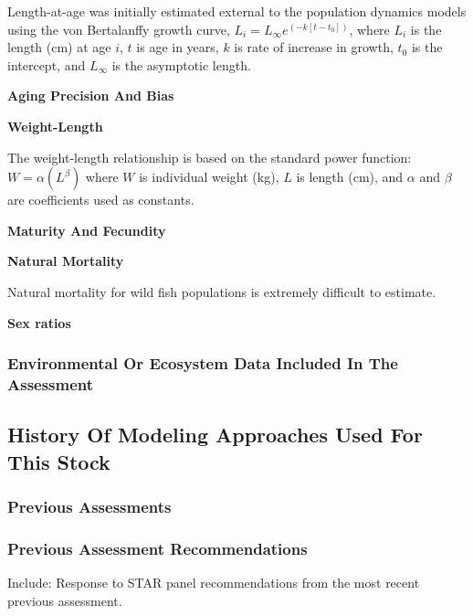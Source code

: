 \documentclass[12pt,]{article}
\begin{document}
Length-at-age was initially estimated external to the population
dynamics models using the von Bertalanffy growth curve,
\(L_i = L_{\infty}e^{(-k[t-t_0])}\), where \(L_i\) is the length (cm) at
age \(i\), \(t\) is age in years, \(k\) is rate of increase in growth,
\(t_0\) is the intercept, and \(L_{\infty}\) is the asymptotic length.

\vspace{.5cm} \textbf{Aging Precision And Bias}

\vspace{.5cm} \textbf{Weight-Length}

The weight-length relationship is based on the standard power function:
\(W = \alpha(L^\beta)\) where \(W\) is individual weight (kg), \(L\) is
length (cm), and \(\alpha\) and \(\beta\) are coefficients used as
constants.

\vspace{.5cm} \textbf{Maturity And Fecundity}

\vspace{.5cm} \textbf{Natural Mortality}

Natural mortality for wild fish populations is extremely difficult to
estimate.

\vspace{.5cm} \textbf{Sex ratios}

\subsubsection{Environmental Or Ecosystem Data Included In The
Assessment}\label{environmental-or-ecosystem-data-included-in-the-assessment}

\subsection{History Of Modeling Approaches Used For This
Stock}\label{history-of-modeling-approaches-used-for-this-stock}

\subsubsection{Previous Assessments}\label{previous-assessments}

\subsubsection{Previous Assessment
Recommendations}\label{previous-assessment-recommendations}

Include: Response to STAR panel recommendations from the most recent
previous assessment.
\end{document}
